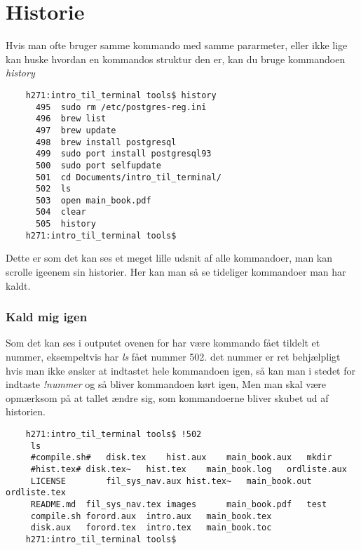 \chapter{Historie}
Hvis man ofte bruger samme kommando med samme pararmeter, eller ikke lige kan huske hvordan en kommandos struktur den er, kan du bruge kommandoen \textit{history}
\begin{lstlisting}
	h271:intro_til_terminal tools$ history
	  495  sudo rm /etc/postgres-reg.ini
	  496  brew list
	  497  brew update
	  498  brew install postgresql
	  499  sudo port install postgresql93
	  500  sudo port selfupdate
	  501  cd Documents/intro_til_terminal/
	  502  ls
	  503  open main_book.pdf 
	  504  clear
	  505  history
	h271:intro_til_terminal tools$ 
\end{lstlisting}
Dette er som det kan ses et meget lille udsnit af alle kommandoer, man kan scrolle igeenem sin historier. Her kan man så se tideliger kommandoer man har kaldt. 
\subsection*{Kald mig igen}
Som det kan ses i outputet ovenen for har være kommando fået tildelt et nummer, eksempeltvis har \textit{ls} fået nummer 502. det nummer er ret behjælpligt hvis man ikke ønsker at indtastet hele kommandoen igen, så kan man i stedet for indtaste \textit{!nummer} og så bliver kommandoen kørt igen, Men man skal være opmærksom på at tallet ændre sig, som kommandoerne bliver skubet ud af historien. 
\begin{lstlisting}
	h271:intro_til_terminal tools$ !502
	 ls
	 #compile.sh#	disk.tex	hist.aux	main_book.aux	mkdir
	 #hist.tex#	disk.tex~	hist.tex	main_book.log	ordliste.aux
	 LICENSE		fil_sys_nav.aux	hist.tex~	main_book.out	ordliste.tex
	 README.md	fil_sys_nav.tex	images		main_book.pdf	test
	 compile.sh	forord.aux	intro.aux	main_book.tex
	 disk.aux	forord.tex	intro.tex	main_book.toc
	h271:intro_til_terminal tools$ 
\end{lstlisting}

